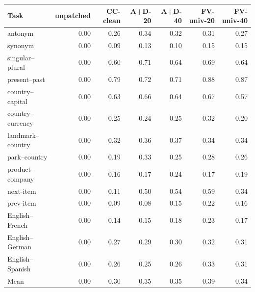 \begin{tabular}{lrrrrrr}
\toprule
Task & unpatched & CC-clean & A+D-20 & A+D-40 & FV-univ-20 & FV-univ-40 \\
\midrule
antonym & 0.00 & 0.26 & 0.34 & 0.32 & 0.31 & 0.27 \\
synonym & 0.00 & 0.09 & 0.13 & 0.10 & 0.15 & 0.15 \\
singular--plural & 0.00 & 0.60 & 0.71 & 0.64 & 0.69 & 0.64 \\
present--past & 0.00 & 0.79 & 0.72 & 0.71 & 0.88 & 0.87 \\
country--capital & 0.00 & 0.63 & 0.66 & 0.64 & 0.67 & 0.57 \\
country--currency & 0.00 & 0.25 & 0.24 & 0.25 & 0.32 & 0.20 \\
landmark--country & 0.00 & 0.32 & 0.36 & 0.37 & 0.34 & 0.34 \\
park--country & 0.00 & 0.19 & 0.33 & 0.25 & 0.28 & 0.26 \\
product--company & 0.00 & 0.16 & 0.17 & 0.24 & 0.17 & 0.19 \\
next-item & 0.00 & 0.11 & 0.50 & 0.54 & 0.59 & 0.34 \\
prev-item & 0.00 & 0.09 & 0.08 & 0.15 & 0.22 & 0.16 \\
English--French & 0.00 & 0.14 & 0.15 & 0.18 & 0.23 & 0.17 \\
English--German & 0.00 & 0.27 & 0.29 & 0.30 & 0.32 & 0.31 \\
English--Spanish & 0.00 & 0.26 & 0.25 & 0.26 & 0.33 & 0.31 \\
\midrule
Mean & 0.00 & 0.30 & 0.35 & 0.35 & 0.39 & 0.34 \\
\bottomrule
\end{tabular}
